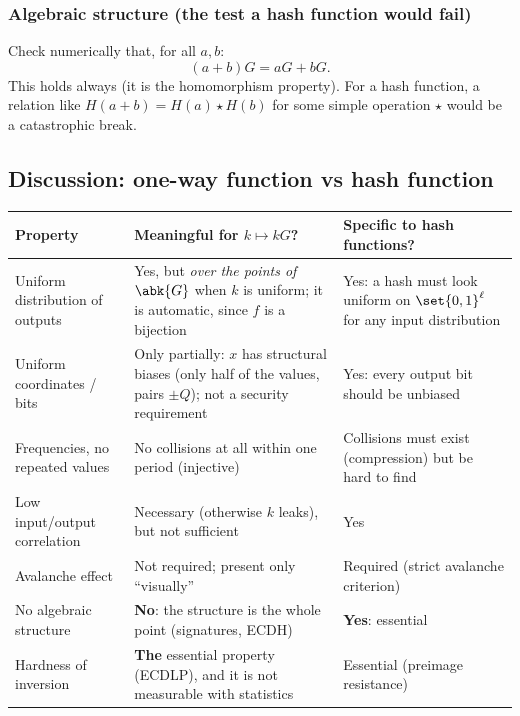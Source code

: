 \subsubsection{Algebraic structure (the test a hash function would fail)}

Check numerically that, for all $a, b$:
\[
  (a + b)G = aG + bG .
\]
This holds always (it is the homomorphism property). For a hash function, a relation like $H(a + b) = H(a) \star H(b)$ for some simple operation $\star$ would be a catastrophic break.

\subsection{Discussion: one-way function vs hash function}

\begin{center}
  \small
  \begin{tabularx}{\textwidth}{l X X}
    \toprule
    Property & Meaningful for $k \mapsto kG$? & Specific to hash functions? \\
    \midrule
    Uniform distribution of outputs & Yes, but \textit{over the points of $\abk{G}$} when $k$ is uniform; it is automatic, since $f$ is a bijection & Yes: a hash must look uniform on $\set{0,1}^\ell$ for any input distribution \\
    Uniform coordinates / bits & Only partially: $x$ has structural biases (only half of the values, pairs $\pm Q$); not a security requirement & Yes: every output bit should be unbiased \\
    Frequencies, no repeated values & No collisions at all within one period (injective) & Collisions must exist (compression) but be hard to find \\
    Low input/output correlation & Necessary (otherwise $k$ leaks), but not sufficient & Yes \\
    Avalanche effect & Not required; present only ``visually'' & Required (strict avalanche criterion) \\
    No algebraic structure & \textbf{No}: the structure is the whole point (signatures, ECDH) & \textbf{Yes}: essential \\
    Hardness of inversion & \textbf{The} essential property (ECDLP), and it is not measurable with statistics & Essential (preimage resistance) \\
    \bottomrule
  \end{tabularx}
\end{center}

